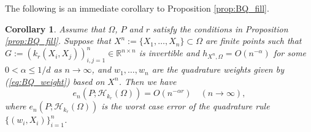\documentclass[11pt]{article}
\newtheorem{corollary}[theorem]{Corollary}
\theoremstyle{remark}
\theoremstyle{example}
\theoremstyle{remark}
\renewcommand{\H}{{\mathcal{H}}}
\newcommand{\R}{\mathbb{R}}
\begin{document}
The following is an immediate corollary to Proposition \ref{prop:BQ_fill}.

\begin{corollary} \label{coro:BQ_rate_well}
Assume that $\Omega$, $P$ and $r$ satisfy the conditions in Proposition \ref{prop:BQ_fill}.
Suppose that $X^n := \{ X_1, \dots, X_n \} \subset \Omega$ are finite points such that $G := (k_r(X_i,X_j))_{i,j=1}^n \in \R^{n \times n}$ is invertible and $h_{X^n, \Omega} = O(n^{- \alpha})$ for some $0 < \alpha \leq 1/d$ as $n \to \infty$, 
and $w_1,\dots,w_n$ are the quadrature weights given by (\ref{eq:BQ_weight}) based on $X^n$.
Then we have 
\begin{equation} \label{eq:rate_BQ_rate_well}
e_n(P;\H_{k_r}(\Omega))  = O(n^{- \alpha r}) \quad (n \to \infty),
\end{equation}
where $e_n(P; \H_{k_r}(\Omega))$ is the worst case error of the quadrature rule $\{ (w_i,X_i) \}_{i=1}^n$.
\end{corollary}
\end{document}
